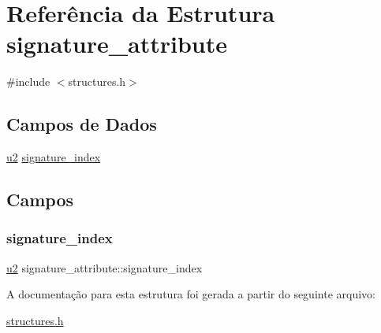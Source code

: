 \hypertarget{structsignature__attribute}{}\section{Referência da Estrutura signature\+\_\+attribute}
\label{structsignature__attribute}


{\ttfamily \#include $<$structures.\+h$>$}

\subsection*{Campos de Dados}
\begin{DoxyCompactItemize}
\item 
\hyperlink{lista__operandos_8h_a732cde1300aafb73b0ea6c2558a7a54f}{u2} \hyperlink{structsignature__attribute_a63a67e73289180add457fbc0ae36413f}{signature\+\_\+index}
\end{DoxyCompactItemize}


\subsection{Campos}
\mbox{\label{structsignature__attribute_a63a67e73289180add457fbc0ae36413f}} 
\subsubsection{\texorpdfstring{signature\+\_\+index}{signature\_index}}
{\footnotesize\ttfamily \hyperlink{lista__operandos_8h_a732cde1300aafb73b0ea6c2558a7a54f}{u2} signature\+\_\+attribute\+::signature\+\_\+index}



A documentação para esta estrutura foi gerada a partir do seguinte arquivo\+:\begin{DoxyCompactItemize}
\item 
\hyperlink{structures_8h}{structures.\+h}\end{DoxyCompactItemize}
